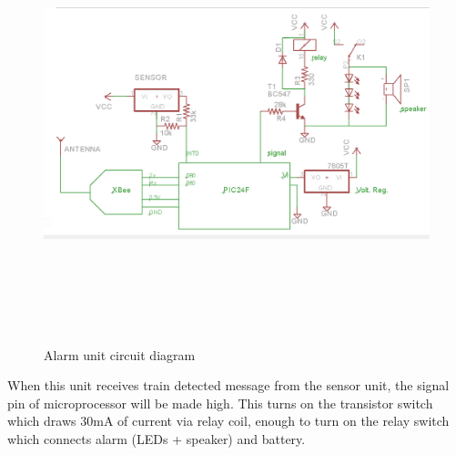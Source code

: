 \documentclass[aps,letterpaper,11pt]{article}
\begin{document}
\begin{figure}[H]
\begin{center}
\includegraphics[height = 5in,width=7in,angle=00]{figures/alarmCircuit.png}
\caption{\small Alarm unit circuit diagram}
\end{center}
\end{figure}
When this unit receives train detected message from the sensor unit, the signal pin of microprocessor will
be made high. This turns on the transistor switch which draws 30mA of current via relay coil, enough to
turn on the relay switch which connects alarm (LEDs + speaker) and battery.


\newpage
\end{document}
